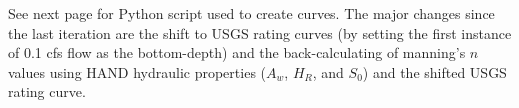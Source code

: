 \documentclass[11pt]{article}
\begin{document}
\vspace{1ex}

See next page for Python script used to create curves. The major changes since the last iteration are the shift to USGS rating curves (by setting the first instance of 0.1 cfs flow as the bottom-depth) and the back-calculating of manning's $n$ values using HAND hydraulic properties ($A_w$, $H_R$, and $S_0$) and the shifted USGS rating curve. 

\clearpage


\end{document}
